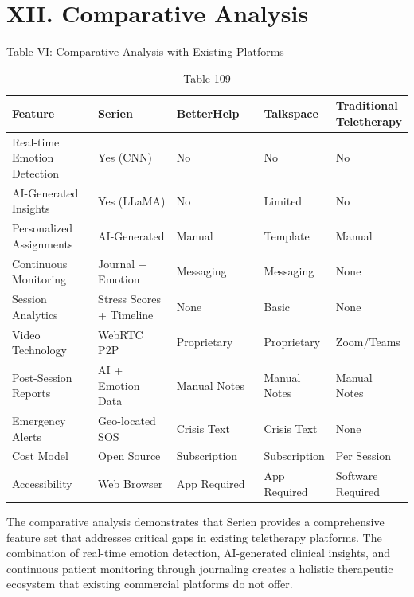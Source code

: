 \documentclass[conference]{IEEEtran}
\begin{document}
\section{XII. Comparative Analysis}
Table VI: Comparative Analysis with Existing Platforms
\begin{table}[t]
\centering
\caption{Table 109}
\begin{tabular}{|p{0.3\linewidth}|p{0.3\linewidth}|p{0.3\linewidth}|p{0.3\linewidth}|p{0.3\linewidth}|}
\hline
Feature & Serien & BetterHelp & Talkspace & Traditional Teletherapy \\
\hline
Real-time Emotion Detection & Yes (CNN) & No & No & No \\
\hline
AI-Generated Insights & Yes (LLaMA) & No & Limited & No \\
\hline
Personalized Assignments & AI-Generated & Manual & Template & Manual \\
\hline
Continuous Monitoring & Journal + Emotion & Messaging & Messaging & None \\
\hline
Session Analytics & Stress Scores + Timeline & None & Basic & None \\
\hline
Video Technology & WebRTC P2P & Proprietary & Proprietary & Zoom/Teams \\
\hline
Post-Session Reports & AI + Emotion Data & Manual Notes & Manual Notes & Manual Notes \\
\hline
Emergency Alerts & Geo-located SOS & Crisis Text & Crisis Text & None \\
\hline
Cost Model & Open Source & Subscription & Subscription & Per Session \\
\hline
Accessibility & Web Browser & App Required & App Required & Software Required \\
\hline
\end{tabular}
\end{table}
The comparative analysis demonstrates that Serien provides a comprehensive feature set that addresses critical gaps in existing teletherapy platforms. The combination of real-time emotion detection, AI-generated clinical insights, and continuous patient monitoring through journaling creates a holistic therapeutic ecosystem that existing commercial platforms do not offer.
\end{document}

